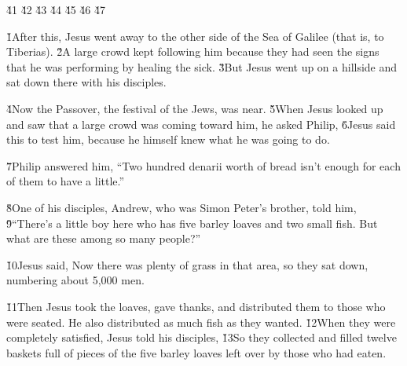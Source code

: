 \v{41} \v{42} \v{43} \v{44} \v{45} \v{46} \v{47}

\v{1}After this, Jesus went away to the other side of the Sea of Galilee (that is, to Tiberias). \v{2}A large crowd kept following him because they had seen the signs that he was performing by healing the sick. \v{3}But Jesus went up on a hillside and sat down there with his disciples.

\v{4}Now the Passover, the festival of the Jews, was near. \v{5}When Jesus looked up and saw that a large crowd was coming toward him, he asked Philip,  \v{6}Jesus said this to test him, because he himself knew what he was going to do.

\v{7}Philip answered him, ``Two hundred denarii worth of bread isn't enough for each of them to have a little.''

\v{8}One of his disciples, Andrew, who was Simon Peter's brother, told him, \v{9}``There's a little boy here who has five barley loaves and two small fish. But what are these among so many people?''

\v{10}Jesus said,  Now there was plenty of grass in that area, so they sat down, numbering about 5,000 men.

\v{11}Then Jesus took the loaves, gave thanks, and distributed them to those who were seated. He also distributed as much fish as they wanted. \v{12}When they were completely satisfied, Jesus told his disciples,  \v{13}So they collected and filled twelve baskets full of pieces of the five barley loaves left over by those who had eaten.

